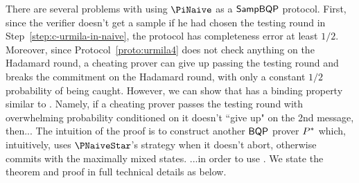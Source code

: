 There are several problems with using $\PiNaive$ as a $\operatorname{\mathsf{SampBQP}}$ protocol. First, since the verifier doesn't get a sample if he had chosen the testing round in Step~\ref{step:c-urmila-in-naive}, the protocol has completeness error at least $1/2$. Moreover, since Protocol~\ref{proto:urmila4} does not check anything on the Hadamard round, a cheating prover can give up passing the testing round and breaks the commitment on the Hadamard round, with only a constant $1/2$ probability of being caught.
However, we can show that  has a binding property similar to .
Namely, if a cheating prover passes the testing round with overwhelming probability conditioned on it doesn't ``give up" on the 2nd message, then... 
The intuition of the proof is to construct another $\operatorname{\mathsf{BQP}}$ prover $P^*$ which, intuitively, uses $\PNaiveStar$'s strategy when it doesn't abort,
otherwise commits with the maximally mixed states.
...in order to use .
We state the theorem and proof in full technical details as below.

